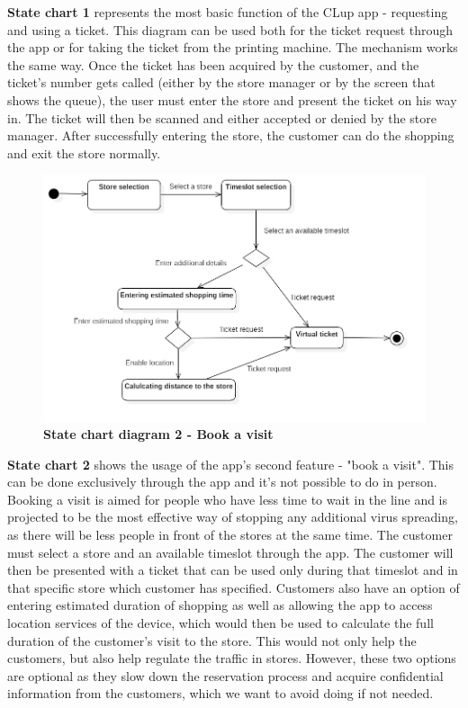 \hspace{\parindent}\textbf{State chart 1} represents the most basic function of the CLup app - requesting and using a ticket. This diagram can be used both for the ticket request through the app or for taking the ticket from the printing machine. The mechanism works the same way. Once the ticket has been acquired by the customer, and the ticket's number gets called (either by the store manager or by the screen that shows the queue), the user must enter the store and present the ticket on his way in. The ticket will then be scanned and either accepted or denied by the store manager. After successfully entering the store, the customer can do the shopping and exit the store normally.  

\begin{figure}[!htb]
\centering
\includegraphics[width=\textwidth]{Images/StatechartDiagram2_BookAVisit}
\caption{\label{fig:statechart2}\textbf{State chart diagram 2 - Book a visit}}
\end{figure}
\newpage


\hspace{\parindent}\textbf{State chart 2} shows the usage of the app's second feature - "book a visit". This can be done exclusively through the app and it's not possible to do in person. Booking a visit is aimed for people who have less time to wait in the line and is projected to be the most effective way of stopping any additional virus spreading, as there will be less people in front of the stores at the same time. The customer must select a store and an available timeslot through the app. The customer will then be presented with a ticket that can be used only during that timeslot and in that specific store which customer has specified. Customers also have an option of entering estimated duration of shopping as well as allowing the app to access location services of the device, which would then be used to calculate the full duration of the customer's visit to the store. This would not only help the customers, but also help regulate the traffic in stores. However, these two options are optional as they slow down the reservation process and acquire confidential information from the customers, which we want to avoid doing if not needed.

